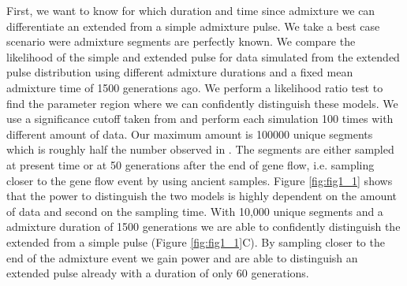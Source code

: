 \documentclass[11pt]{article}
\begin{document}
First, we want to know for which duration and time since admixture we can differentiate an extended from a simple admixture pulse. We take a best case scenario were admixture segments are perfectly known. We compare the likelihood of the simple and extended pulse for data simulated from the extended pulse distribution using different admixture durations and a fixed mean admixture time of 1500 generations ago. We perform a likelihood ratio test to find the parameter region where we can confidently distinguish these models. We use a significance cutoff taken from \cite{Kozubowski_Testing_2008} and perform each simulation 100 times with different amount of data. Our maximum amount is 100000 unique segments which is roughly half the number observed in \cite{skov_nature_2020}. The segments are either sampled at present time or at 50 generations after the end of gene flow, i.e. sampling closer to the gene flow event by using ancient samples. Figure \ref{fig:fig1_1} shows that the power to distinguish the two models is highly dependent on the amount of data and second on the sampling time. With 10,000 unique segments and a admixture duration of 1500 generations we are able to confidently distinguish the extended from a simple pulse (Figure \ref{fig:fig1_1}C). By sampling closer to the end of the admixture event we gain power and are able to distinguish an extended pulse already with a duration of only 60 generations.
\end{document}
